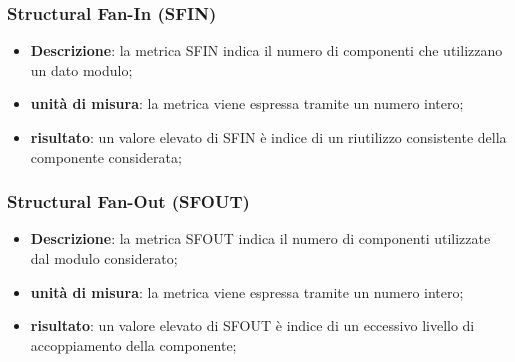 		\subsubsection*{Structural Fan-In (SFIN)}
		\begin{itemize}
			\item{\textbf{Descrizione}}: la metrica SFIN indica il numero di componenti che utilizzano un dato modulo;
			\item{\textbf{unità di misura}}: la metrica viene espressa tramite un numero intero;
			\item{\textbf{risultato}}: un valore elevato di SFIN è indice di un riutilizzo consistente della componente considerata;
		\end{itemize}

		\subsubsection*{Structural Fan-Out (SFOUT)}
		\begin{itemize}
			\item{\textbf{Descrizione}}: la metrica SFOUT indica il numero di componenti utilizzate dal modulo considerato;
			\item{\textbf{unità di misura}}: la metrica viene espressa tramite un numero intero;
			\item{\textbf{risultato}}: un valore elevato di SFOUT è indice di un eccessivo livello di accoppiamento della componente;
		\end{itemize}

